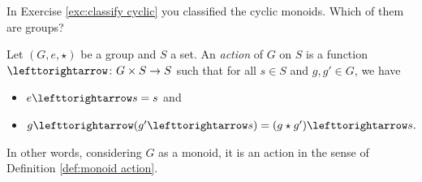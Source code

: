 \begin{exerciseRUS}\label{exc:permutation}
\end{exerciseRUS}

\begin{exerciseENG}
In Exercise \ref{exc:classify cyclic} you classified the cyclic monoids. Which of them are groups? 
\end{exerciseENG}

\begin{exerciseRUS}
\end{exerciseRUS}

\begin{definitionENG}\label{def:group action}
Let $(G,e,\star)$ be a group and $S$ a set. An {\em action} of $G$ on $S$ is a function $\acts\taking G\times S\to S$ such that for all $s\in S$ and $g,g'\in G$, we have
\begin{itemize}
\item $e\acts s=s$ and
\item $g\acts(g'\acts s)=(g\star g')\acts s.$
\end{itemize}
In other words, considering $G$ as a monoid, it is an action in the sense of Definition \ref{def:monoid action}.
\end{definitionENG}

\begin{definitionRUS}\label{def:group action}
\end{definitionRUS}

